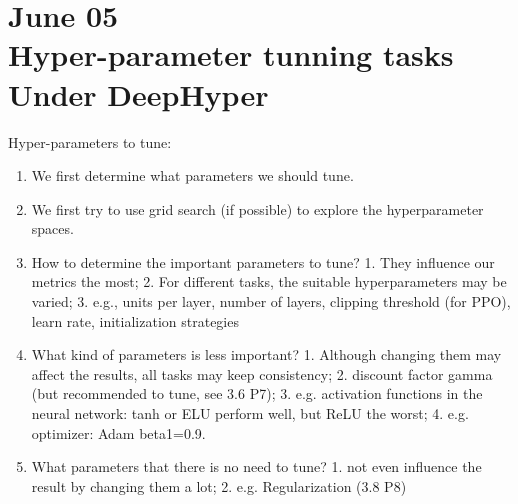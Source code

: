 \section{June 05\\ 
{\large Hyper-parameter tunning tasks Under DeepHyper}}

Hyper-parameters to tune:

\begin{enumerate}
  \item We first determine what parameters we should tune.
  \item We first try to use grid search (if possible) to explore the hyperparameter spaces.
  \item How to determine the important parameters to tune? 1. They influence our metrics the most; 2. For different tasks, the suitable hyperparameters may be varied; 3. e.g., units per layer, number of layers, clipping threshold (for PPO), learn rate, initialization strategies 
  \item What kind of parameters is less important? 1. Although changing them may affect the results, all tasks may keep consistency; 2. discount factor gamma (but recommended to tune, see 3.6 P7); 3. e.g. activation functions in the neural network: tanh or ELU perform well, but ReLU the worst; 4. e.g. optimizer: Adam beta1=0.9.
  \item What parameters that there is no need to tune? 1. not even influence the result by changing them a lot; 2. e.g. Regularization (3.8 P8)
\end{enumerate}
